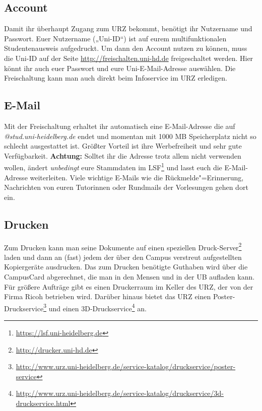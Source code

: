 \subsection{Account}
Damit ihr überhaupt Zugang zum URZ bekommt, benötigt ihr Nutzername und Passwort. Euer Nutzername („Uni-ID“) ist auf eurem multifunktionalen Studentenausweis aufgedruckt. Um dann den Account nutzen zu können, muss die Uni-ID auf der Seite \url{http://freischalten.uni-hd.de} freigeschaltet werden. Hier könnt ihr auch euer Passwort und eure Uni-E-Mail-Adresse auswählen. Die Freischaltung kann man auch direkt beim Infoservice im URZ erledigen.

\subsection{E-Mail}
Mit der Freischaltung erhaltet ihr automatisch eine E-Mail-Adresse die auf \emph{@stud.uni-heidelberg.de} endet und momentan mit 1000 MB Speicherplatz nicht so schlecht ausgestattet ist. Größter Vorteil ist ihre Werbefreiheit und sehr gute Verfügbarkeit. \textbf{Achtung:} Solltet ihr die Adresse trotz allem nicht verwenden wollen, ändert \emph{unbedingt} eure Stammdaten im LSF\footnote{\url{https://lsf.uni-heidelberg.de}} und lasst euch die E-Mail-Adresse weiterleiten. Viele wichtige E-Mails wie die Rückmelde"=Erinnerung, Nachrichten von euren Tutorinnen oder Rundmails der Vorlesungen gehen dort ein.


\subsection{Drucken}

Zum Drucken kann man seine Dokumente auf einen speziellen Druck-Server\footnote{\url{http://drucker.uni-hd.de}} laden und dann an (fast) jedem der über den Campus verstreut aufgestellten Kopiergeräte ausdrucken. Das zum Drucken benötigte Gut\-ha\-ben wird über die CampusCard abgerechnet, die man in den Mensen und in der \gls{UB} aufladen kann. Für größere Aufträge gibt es einen Druckerraum im Keller des \gls{URZ}, der von der Firma Ricoh betrieben wird. Darüber hinaus bietet das URZ einen Poster-Druckservice\footnote{\url{http://www.urz.uni-heidelberg.de/service-katalog/druckservice/poster-service}} und einen 3D-Druckservice\footnote{\url{http://www.urz.uni-heidelberg.de/service-katalog/druckservice/3d-druckservice.html}} an.

